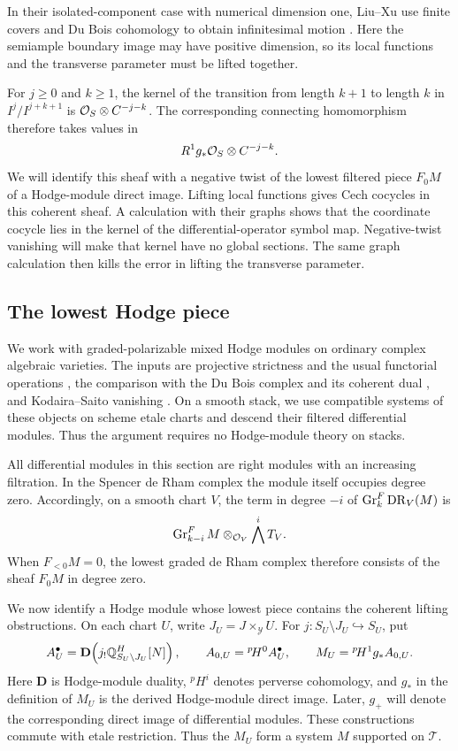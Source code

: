 In their isolated-component case with numerical dimension one,
Liu--Xu use finite covers and Du Bois cohomology to obtain infinitesimal
motion \cite[Theorem~3.1]{LiuXu2025}. Here the semiample boundary image
may have positive dimension, so its local functions and the transverse
parameter must be lifted together.

For \(j\ge0\) and \(k\ge1\), the kernel of the transition from length \(k+1\) to length \(k\)
in \(I^j/I^{j+k+1}\) is \(\mathcal{O}_S\otimes C^{-j-k}\).
The corresponding connecting homomorphism therefore takes values in
\[
 R^1g_*\mathcal{O}_S\otimes C^{-j-k}.
\]
We will identify this sheaf with a negative twist of the lowest
filtered piece \(F_0M\) of a Hodge-module direct image.  Lifting local
functions gives Cech cocycles in this coherent sheaf.  A calculation
with their graphs shows that the coordinate cocycle lies in the kernel
of the differential-operator symbol map.  Negative-twist vanishing
will make that kernel have no global sections.  The same graph
calculation then kills the error in lifting the transverse parameter.

\subsection{The lowest Hodge piece}

We work with graded-polarizable mixed Hodge modules on ordinary
complex algebraic varieties.  The inputs are projective strictness
and the usual functorial operations
\cite[Theorem~2.14 and Section~4]{Saito1990}, the comparison with the
Du Bois complex and its coherent dual
\cite[Theorem~0.2, Corollary~0.3 and Proposition~5.3]{Saito2000}, and
Kodaira--Saito vanishing \cite[Proposition~2.33]{Saito1990}.
On a smooth stack, we use compatible systems of these objects on
scheme etale charts and descend their filtered differential modules.
Thus the argument requires no Hodge-module theory on stacks.

All differential modules in this section are right modules with an
increasing filtration.  In the Spencer de Rham complex the module
itself occupies degree zero.  Accordingly, on a smooth chart \(V\),
the term in
degree \(-i\) of \(\operatorname{Gr}^F_k\operatorname{DR}_V(M)\) is
\[
 \operatorname{Gr}^F_{k-i}M\otimes_{\mathcal{O}_V}\bigwedge^iT_V.
\]
When \(F_{<0}M=0\), the lowest graded de Rham complex therefore
consists of the sheaf \(F_0M\) in degree zero.

We now identify a Hodge module whose lowest piece contains the
coherent lifting obstructions. On each chart \(U\), write
\(J_U=J\times_{\mathcal Y}U\).
For \(j:S_U\setminus J_U\hookrightarrow S_U\), put
\[
 A^\bullet_U=\mathbf D\!\left(
             j_!\mathbb{Q}^H_{S_U\setminus J_U}[N]\right),
 \qquad
 A_{0,U}={}^{p}\!H^0A^\bullet_U,
 \qquad
 M_U={}^{p}\!H^1g_*A_{0,U}.
\]
Here \(\mathbf D\) is Hodge-module duality, \({}^pH^i\) denotes
perverse cohomology, and \(g_*\) in the definition of \(M_U\)
is the derived Hodge-module direct image.  Later, \(g_+\) will
denote the corresponding direct image of differential modules.
These constructions commute with etale restriction.  Thus the
\(M_U\) form a system \(M\) supported on \(\mathcal T\).

